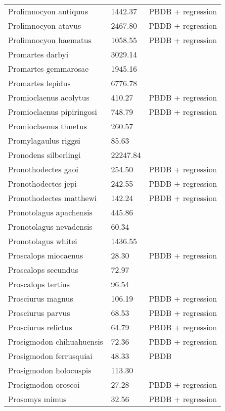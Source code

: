 \documentclass{article}
\begin{document}
\begin{center}
\begin{longtable}{p{} p{} p{} }
  Prolimnocyon antiquus & 1442.37 & PBDB + regression \\ 
  Prolimnocyon atavus & 2467.80 & PBDB + regression \\ 
  Prolimnocyon haematus & 1058.55 & PBDB + regression \\ 
  Promartes darbyi & 3029.14 & \cite{Dawson2007} \\ 
  Promartes gemmarosae & 1945.16 & \cite{Dawson2007} \\ 
  Promartes lepidus & 6776.78 & \cite{Mora2005} \\ 
  Promioclaenus acolytus & 410.27 & PBDB + regression \\ 
  Promioclaenus pipiringosi & 748.79 & PBDB + regression \\ 
  Promioclaenus thnetus & 260.57 & \cite{Gazin1930} \\ 
  Promylagaulus riggsi & 85.63 & \cite{Tomiya2013} \\ 
  Pronodens silberlingi & 22247.84 & \cite{Tomiya2013} \\ 
  Pronothodectes gaoi & 254.50 & PBDB + regression \\ 
  Pronothodectes jepi & 242.55 & PBDB + regression \\ 
  Pronothodectes matthewi & 142.24 & PBDB + regression \\ 
  Pronotolagus apachensis & 445.86 & \cite{Tomiya2013} \\ 
  Pronotolagus nevadensis & 60.34 & \cite{Tomiya2013} \\ 
  Pronotolagus whitei & 1436.55 & \cite{Tomiya2013} \\ 
  Proscalops miocaenus & 28.30 & PBDB + regression \\ 
  Proscalops secundus & 72.97 & \cite{Tomiya2013} \\ 
  Proscalops tertius & 96.54 & \cite{Tomiya2013} \\ 
  Prosciurus magnus & 106.19 & PBDB + regression \\ 
  Prosciurus parvus & 68.53 & PBDB + regression \\ 
  Prosciurus relictus & 64.79 & PBDB + regression \\ 
  Prosigmodon chihuahuensis & 72.36 & PBDB + regression \\ 
  Prosigmodon ferrusquiai & 48.33 & PBDB \\ 
  Prosigmodon holocuspis & 113.30 & \cite{Tomiya2013} \\ 
  Prosigmodon oroscoi & 27.28 & PBDB + regression \\ 
  Prosomys mimus & 32.56 & PBDB + regression \\ 

\end{longtable}
\end{center}
\end{document}
